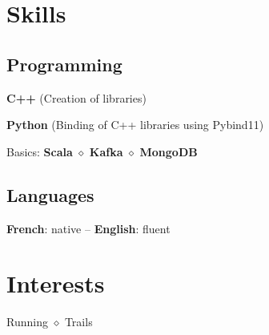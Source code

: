 \documentclass[]{deedy-resume-openfont}
\begin{document}
\begin{minipage}[t]{0.39\textwidth}


	\vspace{\topsep}
	\section{Skills}

	\subsection{Programming}

	\vspace{\topsep}
	\begin{tightemize}
		\item[\diamond] \textbf{C++} (Creation of libraries)
		\item[\diamond] \textbf{Python} (Binding of C++ libraries using Pybind11)
		\item[\diamond] Basics: \textbf{Scala} $\diamond$ \textbf{Kafka} $\diamond$ \textbf{MongoDB}
	\end{tightemize}

	\sectionsep
	\subsection{Languages}
	\textbf{French}: native -- \textbf{English}: fluent


	\vspace{\topsep}
	\section{Interests}
	Running $\diamond$ Trails

\end{minipage}
\hfill
\end{document}
